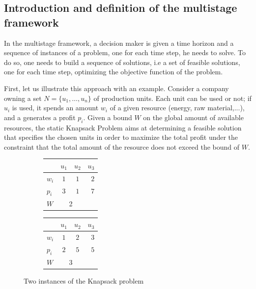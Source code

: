 \documentclass[a4paper]{book}
\begin{document}
\subsection{Introduction and definition of the multistage framework}\label{multiintro}

In the multistage framework, a decision maker is given a time horizon and a sequence of instances of a problem, one for each time step, he needs to solve. To do so, one needs to build a sequence of solutions, i.e a set of feasible solutions, one for each time step, optimizing the objective function of the problem. 

First, let us illustrate this approach with an example. Consider a company owning a set $N=\{u_1,\ldots,u_n\}$ of production units. Each unit can be used or not; if $u_i$ is used, it spends an amount $w_i$ of a given resource (energy, raw material,...), and a generates a profit $p_i$. Given a bound $W$ on the global amount of available resources, the static {\sc Knapsack Problem} aims at determining a feasible solution that specifies the chosen units in order to maximize the total profit under the constraint that the total amount of the resource does not exceed the bound of $W$.

\begin{figure}[h]
\centering
\begin{subfigure}[b]{0.4\textwidth}
\begin{tabular}{|l|c|c|r|}
  \hline
   &$u_1$&$u_2$&$u_3$ \\
  \hline
 $w_{i}$ & $1$ & $1$ & $2$\\
    \hline
  $p_{i} $& $3$ & $1$ & $7$\\
  \hline
  $W$ & \multicolumn{2}{c}{\text{   }2} &\\
  \hline
\end{tabular}
\end{subfigure}
\begin{subfigure}[b]{0.4\textwidth}
\begin{tabular}{|l|c|c|r|}
  \hline
   &$u_1$&$u_2$&$u_3$ \\
  \hline
 $w_{i}$ & $1$ & $2$ & $3$\\
    \hline
  $p_{i} $& $2$ & $5$ & $5$\\
  \hline
   $W$ & \multicolumn{2}{c}{\text{     }3} &\\
  \hline
\end{tabular}
\end{subfigure}
\caption{Two instances of the {\sc Knapsack} problem}
\label{statickp}
\end{figure}
\end{document}
